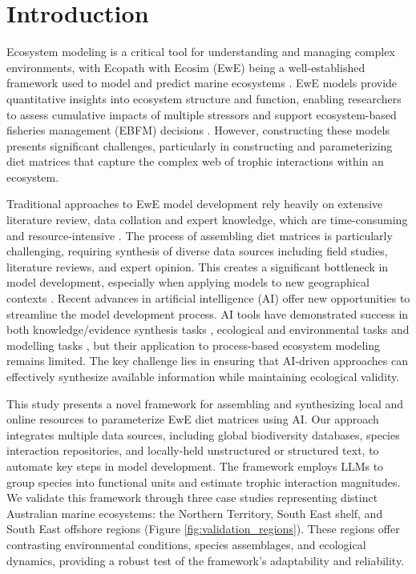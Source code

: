 \section{Introduction}

Ecosystem modeling is a critical tool for understanding and managing complex environments, with Ecopath with Ecosim (EwE) being a well-established framework used to model and predict marine ecosystems \citep{Christensen2004, Colleter2015}. EwE models provide quantitative insights into ecosystem structure and function, enabling researchers to assess cumulative impacts of multiple stressors and support ecosystem-based fisheries management (EBFM) decisions \citep{Coll2015, Villasante2016,Geary2020}. However, constructing these models presents significant challenges, particularly in constructing and parameterizing diet matrices that capture the complex web of trophic interactions within an ecosystem.

Traditional approaches to EwE model development rely heavily on extensive literature review, data collation and expert knowledge, which are time-consuming and resource-intensive \citep{Holden2024a}. The process of assembling diet matrices is particularly challenging, requiring synthesis of diverse data sources including field studies, literature reviews, and expert opinion. This creates a significant bottleneck in model development, especially when applying models to new geographical contexts \citep{Holden2024b,spilliasfuture}. Recent advances in artificial intelligence (AI) offer new opportunities to streamline the model development process. AI tools have demonstrated success in both knowledge/evidence synthesis tasks \citep{spillias2024human,keck2025extracting,spillias2024evaluating,Zheng2023}, ecological and environmental tasks \citep{Fernandes2024,Li2024,Chen2024} and modelling tasks \citep{Lapeyrolerie2022, Tuia2022, Karniadakis2021}, but their application to process-based ecosystem modeling remains limited. The key challenge lies in ensuring that AI-driven approaches can effectively synthesize available information while maintaining ecological validity.

This study presents a novel framework for assembling and synthesizing local and online resources to parameterize EwE diet matrices using AI. Our approach integrates multiple data sources, including global biodiversity databases, species interaction repositories, and locally-held unstructured or structured text, to automate key steps in model development. The framework employs LLMs to group species into functional units and estimate trophic interaction magnitudes. We validate this framework through three case studies representing distinct Australian marine ecosystems: the Northern Territory, South East shelf, and South East offshore regions (Figure \ref{fig:validation_regions}). These regions offer contrasting environmental conditions, species assemblages, and ecological dynamics, providing a robust test of the framework's adaptability and reliability.

